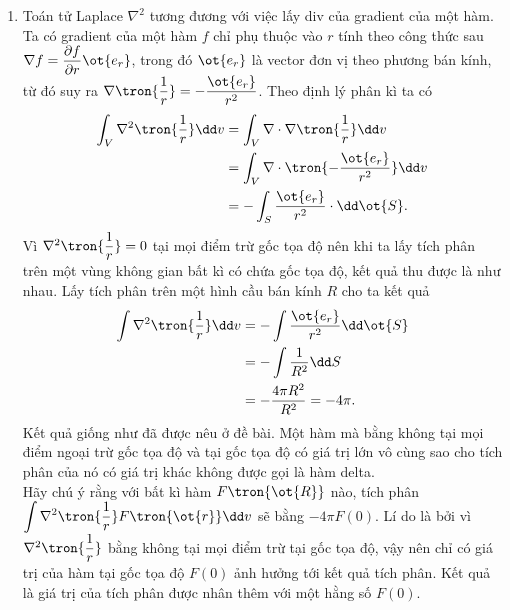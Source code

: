     \begin{loigiai}
        \begin{enumerate}[1)]
        \setlength{\itemsep}{0pt}
            \item Toán tử Laplace $\nabla^2$ tương đương với việc lấy div của gradient của một hàm. Ta có gradient của một hàm $f$ chỉ phụ thuộc vào $r$ tính theo công thức sau $\nabla f=\dfrac{\partial f}{\partial r}\ot{e_r}$,  trong đó $\ot{e_r}$ là vector đơn vị theo phương bán kính, từ đó suy ra $\nabla\tron{\dfrac{1}{r}}=-\dfrac{\ot{e_r}}{r^2}$. Theo định lý phân kì ta có
            \begin{equation}
                \begin{aligned}
                   \int_V\nabla^2\tron{\dfrac{1}{r}}\dd v&=\int_V\nabla\cdot\nabla\tron{\dfrac{1}{r}}\dd v\\
                   &=\int_V\nabla\cdot\tron{-\dfrac{\ot{e_r}}{r^2}}\dd v\\
                   &=-\int_S\dfrac{\ot{e_r}}{r^2}\cdot\dd\ot{S}. 
                \end{aligned}
            \end{equation}
            Vì $\nabla^2\tron{\dfrac{1}{r}}=0$ tại mọi điểm trừ gốc tọa độ nên khi ta lấy tích phân trên một vùng không gian bất kì có chứa gốc tọa độ, kết quả thu được là như nhau. Lấy tích phân trên một hình cầu bán kính $R$ cho ta kết quả
            \begin{equation}
                \begin{aligned}
                   \int\nabla^2\tron{\dfrac{1}{r}}\dd v&=-\int\dfrac{\ot{e_r}}{r^2}\dd\ot{S}\\
                   &=-\int\dfrac{1}{R^2}\dd S\\
                   &=-\dfrac{4\pi R^2}{R^2}=-4\pi.
                \end{aligned}
            \end{equation}
            Kết quả giống như đã được nêu ở đề bài. Một hàm mà bằng không tại mọi điểm ngoại trừ gốc tọa độ và tại gốc tọa độ có giá trị lớn vô cùng sao cho tích phân của nó có giá trị khác không được gọi là hàm delta.\\
            Hãy chú ý rằng với bất kì hàm $F\tron{\ot{R}}$ nào, tích phân $\displaystyle\int \nabla^2\tron{\dfrac{1}{r}}F\tron{\ot{r}}\dd v$ sẽ bằng $-4\pi F(0)$. Lí do là bởi vì $\nabla^2\tron{\dfrac{1}{r}}$ bằng không tại mọi điểm trừ tại gốc tọa độ, vậy nên chỉ có giá trị của hàm tại gốc tọa độ $F(0)$ ảnh hưởng tới kết quả tích phân. Kết quả là giá trị của tích phân được nhân thêm với một hằng số $F(0)$.

\end{enumerate}
\end{loigiai}
